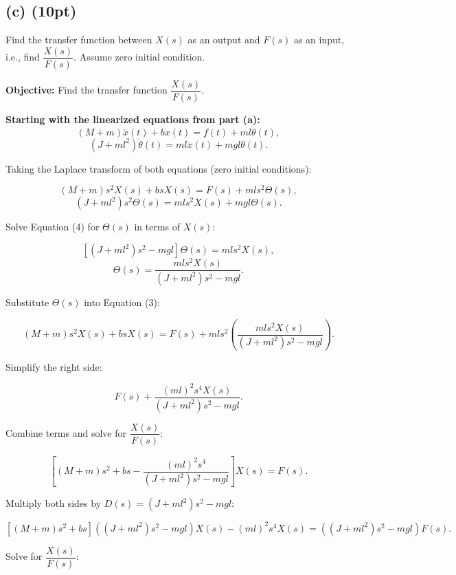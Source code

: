 \documentclass[12pt]{article}
\begin{document}
\subsection*{(c) (10pt)}

Find the transfer function between \( X(s) \) as an output and \( F(s) \) as an input, i.e., find \( \dfrac{X(s)}{F(s)} \). Assume zero initial condition.

\textbf{Objective:} Find the transfer function \( \dfrac{X(s)}{F(s)} \).


\textbf{Starting with the linearized equations from part (a):}
\begin{equation*}
(M + m) \ddot{x}(t) + b \dot{x}(t) = f(t) + ml \ddot{\theta}(t), \tag{1}
\end{equation*}
\begin{equation*}
(J + ml^2)\ddot{\theta}(t) = ml \ddot{x}(t) + mgl \theta(t). \tag{2}
\end{equation*}


Taking the Laplace transform of both equations (zero initial conditions):

\[
(M + m) s^2 X(s) + b s X(s) = F(s) + ml s^2 \Theta(s), \tag{3}
\]
\[
(J + ml^2) s^2 \Theta(s) = ml s^2 X(s) + mgl \Theta(s). \tag{4}
\]

Solve Equation (4) for \( \Theta(s) \) in terms of \( X(s) \):

\[
\left[ (J + ml^2) s^2 - mgl \right] \Theta(s) = ml s^2 X(s),
\]
\[
\Theta(s) = \frac{ml s^2 X(s)}{\left( J + ml^2 \right) s^2 - mgl}. \tag{5}
\]

Substitute \( \Theta(s) \) into Equation (3):

\[
(M + m) s^2 X(s) + b s X(s) = F(s) + ml s^2 \left( \frac{ml s^2 X(s)}{\left( J + ml^2 \right) s^2 - mgl} \right).
\]

Simplify the right side:

\[
F(s) + \frac{(ml)^2 s^4 X(s)}{\left( J + ml^2 \right) s^2 - mgl}.
\]

Combine terms and solve for \( \dfrac{X(s)}{F(s)} \):

\[
\left[ (M + m) s^2 + b s - \frac{(ml)^2 s^4}{(J + ml^2) s^2 - mgl} \right] X(s) = F(s).
\]

Multiply both sides by \( D(s) = (J + ml^2) s^2 - mgl \):

\[
\left[ \left( M + m \right) s^2 + b s \right] ((J + ml^2) s^2 - mgl) X(s) - (ml)^2 s^4 X(s) = ((J + ml^2) s^2 - mgl) F(s).
\]

Solve for \( \dfrac{X(s)}{F(s)} \):
\end{document}
